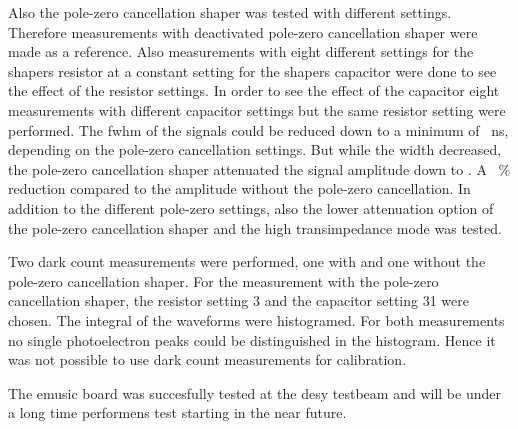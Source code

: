 Also the pole-zero cancellation shaper was tested with different settings.
Therefore measurements with deactivated pole-zero cancellation shaper were made as a reference.
Also measurements with eight different settings for the shapers resistor at a constant setting for the shapers capacitor were done to see the effect of the resistor settings.
In order to see the effect of the capacitor eight measurements with different capacitor settings but the same resistor setting were performed.
The \ac{fwhm} of the signals could be reduced down to a minimum of \SI{}{\nano\second}, depending on the pole-zero cancellation settings.
But while the width decreased, the pole-zero cancellation shaper attenuated the signal amplitude down to \SI{}{}.
A \SI{}{\percent} reduction compared to the \SI{}{} amplitude without the pole-zero cancellation.
In addition to the different pole-zero settings, also the lower attenuation option of the pole-zero cancellation shaper and the high transimpedance mode was tested.

Two dark count measurements were performed, one with and one without the pole-zero cancellation shaper.
For the measurement with the pole-zero cancellation shaper, the resistor setting 3 and the capacitor setting 31 were chosen.
The integral of the waveforms were histogramed.
For both measurements no single photoelectron peaks could be distinguished in the histogram. 
Hence it was not possible to use dark count measurements for calibration.

The \ac{emusic} board was succesfully tested at the \ac{desy} testbeam and will be under a long time performens test starting in the near future.
